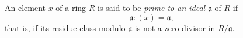 An element $x$ of a ring $R$ is said to be \emph{prime to an ideal} $\mathfrak{a}$ of $R$ if
$$\mathfrak{a}:(x) = \mathfrak{a},$$
that is, if its residue class modulo $\mathfrak{a}$ is not a zero divisor in $R/\mathfrak{a}$.

